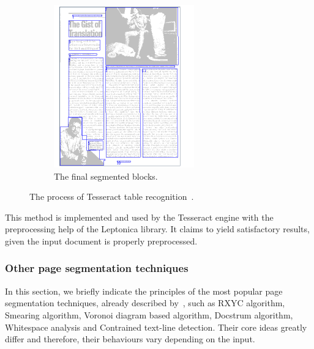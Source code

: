 \begin{figure}[p]
\begin{subfigure}{0.30\textwidth}
\includegraphics[width=\linewidth]{img/tabStopDetection/tessPageSegm5.pdf}
\caption{The final segmented blocks.}
\label{fig:segmentationTesseract5}
\end{subfigure}
\caption{The process of Tesseract table recognition~\cite{tesseractSegmentationTab}.}
\label{fig:segmentationTesseract}
\end{figure}

This method is implemented and used by the Tesseract engine with the preprocessing help of the Leptonica library. It claims to yield satisfactory results, given the input document is properly preprocessed.

\subsubsection{Other page segmentation techniques}

In this section, we briefly indicate the principles of the most popular page segmentation techniques, already described by~\citet{segmentationOverview}, such as RXYC algorithm, Smearing algorithm, Voronoi diagram based algorithm, Docstrum algorithm, Whitespace analysis and Contrained text-line detection. Their core ideas greatly differ and therefore, their behaviours vary depending on the input.

